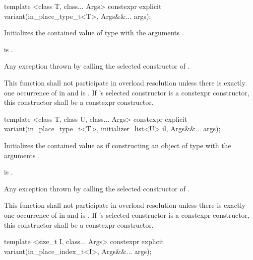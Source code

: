 %
\begin{itemdecl}
template <class T, class... Args> constexpr explicit variant(in_place_type_t<T>, Args&&... args);
\end{itemdecl}

\begin{itemdescr}
\pnum
\effects
Initializes the contained value of type  with the arguments .

\pnum
\postconditions
{} is .

\pnum
\throws
Any exception thrown by calling the selected constructor of .

\pnum
\remarks
This function shall not participate in overload resolution unless there is
exactly one occurrence of  in  and
 is .
If 's selected constructor is a constexpr constructor, this
constructor shall be a constexpr constructor.
\end{itemdescr}

%
\begin{itemdecl}
template <class T, class U, class... Args>
  constexpr explicit variant(in_place_type_t<T>, initializer_list<U> il, Args&&... args);
\end{itemdecl}

\begin{itemdescr}
\pnum
\effects
Initializes the contained value as if constructing an object of type 
with the arguments .

\pnum
\postconditions
{} is .

\pnum
\throws
Any exception thrown by calling the selected constructor of .

\pnum
\remarks
This function shall not participate in overload resolution unless there is
exactly one occurrence of  in  and
 is .
If 's selected constructor is a constexpr constructor, this
constructor shall be a constexpr constructor.
\end{itemdescr}

%
\begin{itemdecl}
template <size_t I, class... Args> constexpr explicit variant(in_place_index_t<I>, Args&&... args);
\end{itemdecl}

